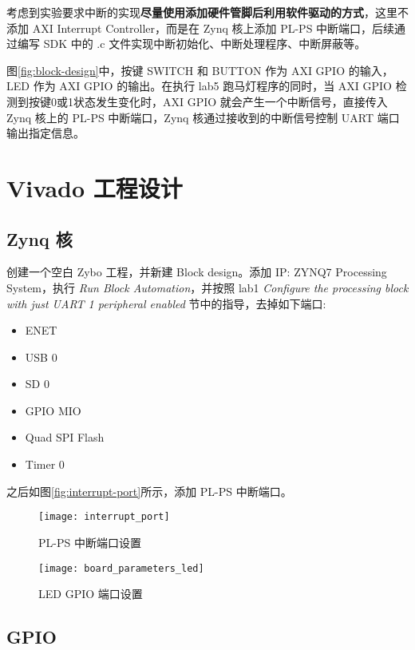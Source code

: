 \documentclass{sjtureport}
\begin{document}
考虑到实验要求中断的实现\textbf{尽量使用添加硬件管脚后利用软件驱动的方式}，这里不添加 AXI Interrupt Controller，而是在 Zynq 核上添加 PL-PS 中断端口，后续通过编写 SDK 中的 .c 文件实现中断初始化、中断处理程序、中断屏蔽等。

图\ref{fig:block-design}中，按键 SWITCH 和 BUTTON 作为 AXI GPIO 的输入，LED 作为 AXI GPIO 的输出。在执行 lab5 跑马灯程序的同时，当 AXI GPIO 检测到按键0或1状态发生变化时，AXI GPIO 就会产生一个中断信号，直接传入 Zynq 核上的 PL-PS 中断端口，Zynq 核通过接收到的中断信号控制 UART 端口输出指定信息。

\section{Vivado 工程设计}

\subsection{Zynq 核}

创建一个空白 Zybo 工程，并新建 Block design。添加 IP: ZYNQ7 Processing System，执行 \textit{Run Block Automation}，并按照 lab1 \textit{Configure the processing block with just UART 1 peripheral enabled} 节中的指导，去掉如下端口:

\begin{itemize}
	\item ENET
	\item USB 0
	\item SD 0
	\item GPIO MIO
	\item Quad SPI Flash
	\item Timer 0
\end{itemize}

之后如图\ref{fig:interrupt-port}所示，添加 PL-PS 中断端口。

\begin{figure}[!htp]
	\centering
	\begin{minipage}{0.48\textwidth}
		\centering
		\texttt{[image: interrupt\_port]}
		\caption{PL-PS 中断端口设置}
		\label{fig:interrupt-port}
	\end{minipage}
	\begin{minipage}{0.48\textwidth}
		\centering
		\texttt{[image: board\_parameters\_led]}
		\caption{LED GPIO 端口设置}
		\label{fig:gpio-led}
	\end{minipage}
\end{figure}

\subsection{GPIO}
\end{document}
